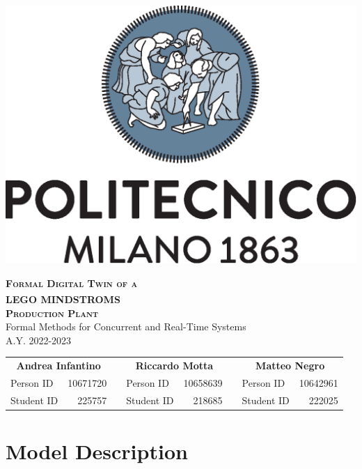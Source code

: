 \documentclass[a4paper,twoside]{article}
\newcommand{\nbvspace}[1][3]{\vspace*{\stretch{#1}}}
\begin{document}
    \begin{titlepage}

        \begin{center}

            \nbvspace[1]

            \includegraphics[width=0.3\columnwidth]{./images/polimi}

            \nbvspace[2]

            {\huge \textbf{\textsc{Formal Digital Twin of a \\ LEGO\textsuperscript{\textregistered} MINDSTROMS\texttrademark \\\medskip Production Plant}}} \\
            [3em]
            {\Large Formal Methods for Concurrent and Real-Time Systems} \\
            [1.5em]
            {\Large A.Y. 2022-2023}

            \nbvspace[8]

            \begin{tabular}{lrp{}lrp{}lr}
                \multicolumn{2}{c}{\large \textbf{Andrea Infantino}} & & \multicolumn{2}{c}{\large \textbf{Riccardo Motta}} & & \multicolumn{2}{c}{\large \textbf{Matteo Negro}} \\
                Person ID & 10671720 & & Person ID & 10658639 & & Person ID & 10642961 \\
                Student ID & 225757 & & Student ID & 218685 & & Student ID & 222025
            \end{tabular}

            \nbvspace[1]

        \end{center}

    \end{titlepage}

    \tableofcontents{}

    \pagebreak

    \section{M\lowercase{odel} D\lowercase{escription}}
\end{document}
